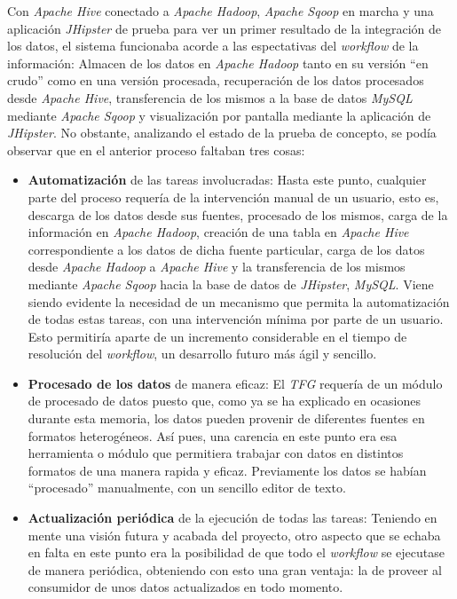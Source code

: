 \par
Con \textit{Apache Hive} conectado a \textit{Apache Hadoop}, \textit{Apache Sqoop} en marcha y una aplicación \textit{JHipster} de prueba para ver un primer resultado de la integración de los datos, el sistema funcionaba acorde a las espectativas del \textit{workflow} de la información: Almacen de los datos en \textit{Apache Hadoop} tanto en su versión ``en crudo'' como en una versión procesada, recuperación de los datos procesados desde \textit{Apache Hive}, transferencia de los mismos a la base de datos \textit{MySQL} mediante \textit{Apache Sqoop} y visualización por pantalla mediante la aplicación de \textit{JHipster}. No obstante, analizando el estado de la prueba de concepto, se podía observar que en el anterior proceso faltaban tres cosas: 
\begin{itemize}
\item \textbf{Automatización} de las tareas involucradas: Hasta este punto, cualquier parte del proceso requería de la intervención manual de un usuario, esto es, descarga de los datos desde sus fuentes, procesado de los mismos, carga de la información en \textit{Apache Hadoop}, creación de una tabla en \textit{Apache Hive} correspondiente a los datos de dicha fuente particular, carga de los datos desde \textit{Apache Hadoop} a \textit{Apache Hive} y la transferencia de los mismos mediante \textit{Apache Sqoop} hacia la base de datos de \textit{JHipster}, \textit{MySQL}. Viene siendo evidente la necesidad de un mecanismo que permita la automatización de todas estas tareas, con una intervención mínima por parte de un usuario. Esto permitiría aparte de un incremento considerable en el tiempo de resolución del \textit{workflow}, un desarrollo futuro más ágil y sencillo. 
\item \textbf{Procesado de los datos} de manera eficaz: El \textit{TFG} requería de un módulo de procesado de datos puesto que, como ya se ha explicado en ocasiones durante esta memoria, los datos pueden provenir de diferentes fuentes en formatos heterogéneos. Así pues, una carencia en este punto era esa herramienta o módulo que permitiera trabajar con datos en distintos formatos de una manera rapida y eficaz. Previamente los datos se habían ``procesado'' manualmente, con un sencillo editor de texto. 
\item \textbf{Actualización periódica} de la ejecución de todas las tareas: Teniendo en mente una visión futura y acabada del proyecto, otro aspecto que se echaba en falta en este punto era la posibilidad de que todo el \textit{workflow} se ejecutase de manera periódica, obteniendo con esto una gran ventaja: la de proveer al consumidor de unos datos actualizados en todo momento. 
\end{itemize}


